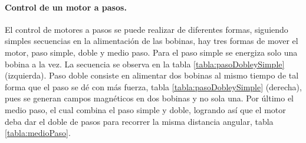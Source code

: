 \paragraph{Control de un motor a pasos.}
El control de motores a pasos se puede realizar de diferentes formas, siguiendo simples secuencias en la alimentación de las bobinas, hay tres formas de mover el motor, paso simple, doble y medio paso. Para el paso simple se energiza solo una bobina a la vez. La secuencia se observa en la tabla \ref{tabla:pasoDobleySimple} (izquierda). Paso doble consiste en alimentar dos bobinas al mismo tiempo de tal forma que el paso se dé con más fuerza, tabla \ref{tabla:pasoDobleySimple} (derecha), pues se generan campos magnéticos en dos bobinas y no sola una. Por último el medio paso, el cual combina el paso simple y doble, logrando así que el motor deba dar el doble de pasos para recorrer la misma distancia angular, tabla \ref{tabla:medioPaso}.


